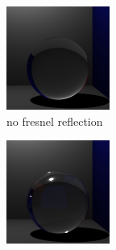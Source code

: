 \begin{figure}[h]
\centering
\begin{subfigure}[b]{0.3\textwidth}
	\includegraphics[width=\textwidth]{./images/renders/refraction/no-reflection.png}
	\caption{no fresnel reflection}
\end{subfigure}
\begin{subfigure}[b]{0.3\textwidth}
	\includegraphics[width=\textwidth]{./images/renders/refraction/fresnel-reflection.png}

\end{subfigure}
\end{figure}
